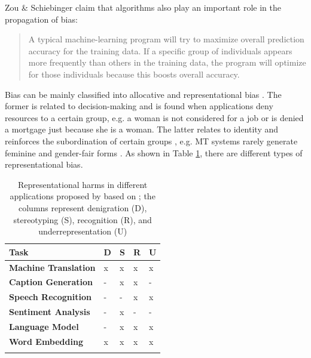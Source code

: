 Zou \& Schiebinger claim that algorithms also play an important role in the propagation of bias: \begin{quote}
    A typical machine-learning program will try to maximize overall prediction accuracy for the training data. If a specific group of individuals appears more frequently than others in the training data, the program will optimize for those individuals because this boosts overall accuracy. \citep{zou2018ai}
\end{quote}

Bias can be mainly classified into allocative and representational bias \citep{crawford2017keynote}. The former is related to decision-making and is found when applications deny resources to a certain group, e.g. a woman is not considered for a job or is denied a mortgage just because she is a woman. The latter relates to identity and reinforces the subordination of certain groups \citep{crawford2017keynote}, e.g. MT systems rarely generate feminine and gender-fair forms \citep{prates2019assessing,dev-etal-2021-harms}. As shown in Table \ref{tab:representationbiasnlp}, there are different types of representational bias.

\begin{table}[ht]
   \caption[Representational harms in applications]{Representational harms in different applications proposed by \textcite{sun2019mitigating} based on \textcite{crawford2017keynote}; the columns represent denigration (D), stereotyping (S), recognition (R), and underrepresentation (U)}
    \centering
    \begin{tabular}{m{4cm}m{1cm}m{1cm}m{1cm}m{1cm}}
    \lsptoprule
         Task & D & S & R & U \\
         \midrule
         \textbf{Machine Translation} & x & x & x & x\footnotemark  \\ 
         \textbf{Caption Generation} & - & x & x & - \\ 
         \textbf{Speech Recognition} & - & - & x & x \\ 
         \textbf{Sentiment Analysis} & - & x & - & - \\ 
         \textbf{Language Model} & - & x & x & x \\
         \textbf{Word Embedding} & x & x & x & x \\
         \lspbottomrule
    \end{tabular}
    \label{tab:representationbiasnlp}
\end{table}

